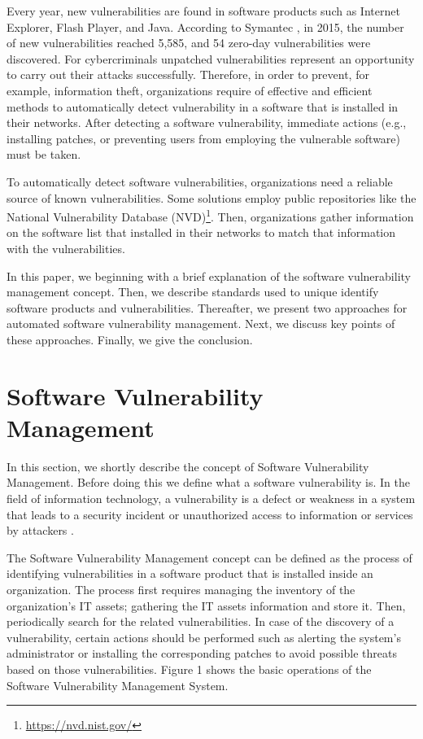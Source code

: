 \documentclass{llncs}
\begin{document}
\par Every year, new vulnerabilities are found in software products such as Internet Explorer, Flash 
 Player, and Java. According to Symantec \cite{symantec}, in 2015, the number of new vulnerabilities 
 reached 5,585, and 54 zero-day vulnerabilities were discovered. For cybercriminals 
 unpatched vulnerabilities represent an opportunity to carry out their attacks successfully. 
 Therefore, in order to prevent, for example, information theft, organizations require of 
 effective and efficient methods to automatically detect vulnerability in a software that is installed in 
 their networks. After detecting a software vulnerability, immediate actions (e.g., installing 
 patches, or preventing users from employing the vulnerable software) must be taken. 
 \par To automatically detect software vulnerabilities, organizations need a reliable source of 
 known vulnerabilities. Some solutions employ public repositories like the National 
 Vulnerability Database (NVD)\footnote{\url{https://nvd.nist.gov/}}. Then, organizations gather information on the software list that  
 installed in their networks to match that information with the vulnerabilities. 
 \par In this paper, we beginning with a brief explanation of the software vulnerability 
 management concept. Then, we describe standards used to unique identify software products 
 and vulnerabilities. Thereafter, we present two approaches for automated software vulnerability management. Next, we discuss key points of these approaches. Finally, we give the conclusion.
       
\section{Software Vulnerability Management}

In this section, we shortly describe the concept of Software Vulnerability Management. Before doing this we define what a software vulnerability is. In the field of information technology, a vulnerability is a defect or weakness in a system that leads to a security incident or unauthorized access to information or services by attackers \cite{vuln}.  

\par The Software Vulnerability Management concept can be defined as the process of identifying vulnerabilities in a software product that is installed inside an organization. The process first requires managing the inventory of the organization's IT assets; gathering the IT assets information and store it. Then,  periodically search for the related vulnerabilities. In case of the discovery of a vulnerability, certain actions should be performed such as alerting the system's administrator or installing the corresponding patches to avoid possible threats based on those vulnerabilities. Figure 1 shows the basic operations of the Software Vulnerability Management System.
\end{document}
